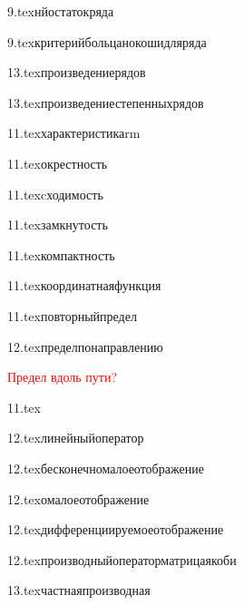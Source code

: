 

{9.tex}{нйостатокряда}

{9.tex}{критерийбольцанокошидляряда}

{13.tex}{произведениерядов}

{13.tex}{произведениестепенныхрядов}

{11.tex}{характеристикаrm}

{11.tex}{окрестность}

{11.tex}{cходимость}
\label{сходимость}

{11.tex}{замкнутость}

{11.tex}{компактность}

{11.tex}{координатнаяфункция}

{11.tex}{повторныйпредел}

{12.tex}{пределпонаправлению}

\textcolor{red}{Предел вдоль пути?}

{11.tex}{}

{12.tex}{линейныйоператор}

{12.tex}{бесконечномалоеотображение}

{12.tex}{омалоеотображение}

{12.tex}{дифференциируемоеотображение}

{12.tex}{производныйоператорматрицаякоби}

{13.tex}{частнаяпроизводная}

